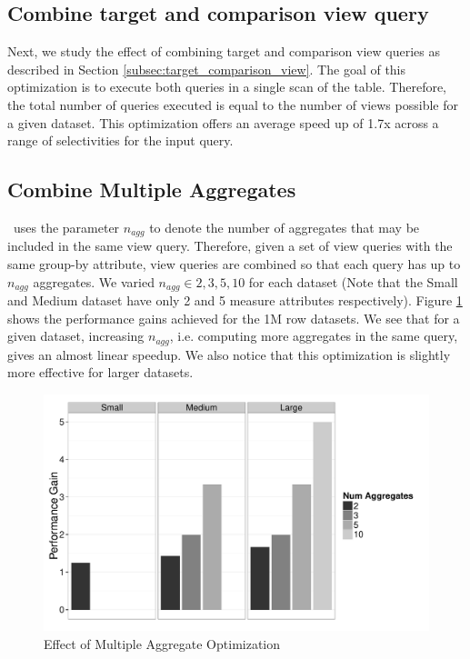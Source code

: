 \subsection{Combine target and comparison view query}
Next, we study the effect of combining target and comparison view queries as
described in Section \ref{subsec:target_comparison_view}. The goal of this
optimization is to execute both queries in a single scan of the table.
Therefore, the total number of queries executed is equal to the number of
views possible for a given dataset. This optimization offers an average speed up
of 1.7x across a range of selectivities for the input query.

\subsection{Combine Multiple Aggregates}
\SeeDB\ uses the parameter $n_{agg}$ to denote the number of aggregates that may
be included in the same view query. Therefore, given a set of view queries with
the same group-by attribute, view queries are combined so that each query has up
to $n_{agg}$ aggregates. We varied $n_{agg} \in {2, 3, 5, 10}$ for each dataset
(Note that the Small and Medium dataset have only 2 and 5 measure attributes
respectively).
Figure \ref{fig:mult_agg} shows the performance gains achieved for the 1M row
datasets. We see that for a given dataset, increasing $n_{agg}$, i.e. computing
more aggregates in the same query, gives an almost linear speedup. We also
notice that this optimization is slightly more effective for larger datasets.

\begin{figure}[h]

  \centering
    \includegraphics[width=12cm]{Images/mult_agg.pdf}
    \caption{Effect of Multiple Aggregate Optimization} 
      \label{fig:mult_agg}
\end{figure}

